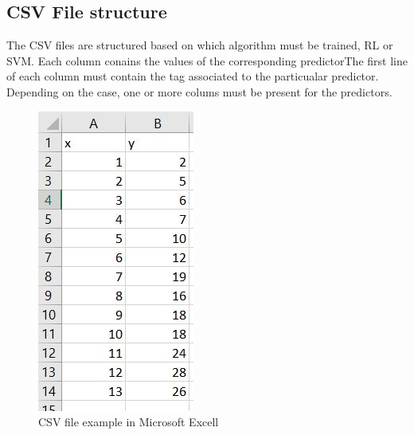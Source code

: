 \subsection{CSV File structure}
The CSV files are structured based on which algorithm must be trained, RL or SVM.
Each column conains the values of the corresponding predictor\glo The first line  of each column must contain the tag associated to the particualar predictor. Depending on the case, one or more colums must be present for the predictors.

\begin{figure}[H]
\centering
\includegraphics[scale=1]{img/json/csvfile.jpg}
\caption{CSV file example in Microsoft Excell}
\end{figure}
